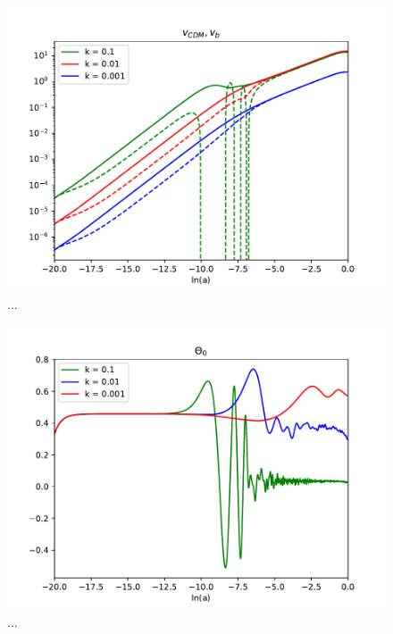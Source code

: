 \documentclass{aa}
\begin{document}
\begin{figure}[h!]
   \includegraphics[scale=0.5]{Figures/M3_Vs.pdf}
   \caption{...}\label{fig:M3_Vs}
\end{figure}

\begin{figure}[h!]
   \includegraphics[scale=0.5]{Figures/M3_theta0.pdf}
   \caption{...}\label{fig:M3_theta0}
\end{figure}
\end{document}
